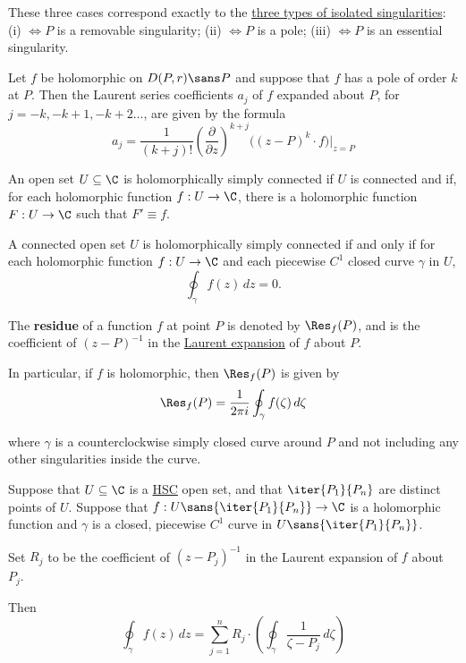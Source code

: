 These three cases correspond exactly to the \href{a7f062e}{three types of
isolated singularities}: (i) $\iff P$ is a removable singularity; (ii) $\iff P$
is a pole; (iii) $\iff P$ is an essential singularity.

\label{c1d2d0c}

Let $f$ be holomorphic on $D(P,r)\sans P$ and suppose that $f$ has a pole of
order $k$ at $P$. Then the Laurent series coefficients $a_j$ of $f$ expanded
about $P$, for $j=-k,-k+1,-k+2\ldots$, are given by the formula
$$
  a_j=\frac1{(k+j)!}\left(\frac\partial{\partial z}\right)^{k+j}
  \big((z-P)^k\cdot f\big)\Bigg|_{z=P}
$$

\label{d20898f}

An open set $U\subseteq\C$ is holomorphically simply connected if $U$ is
connected and if, for each holomorphic function $f:U\to\C$, there is a
holomorphic function $F:U\to\C$ such that $F'\equiv f$.

\label{f3a867e}

A connected open set $U$ is holomorphically simply connected if and only if for
each holomorphic function $f:U\to\C$ and each piecewise $C^1$ closed curve
$\gamma$ in $U$,
$$
  \oint_\gamma f(z)\,dz=0.
$$

\label{ea3ff58}

The \textbf{residue} of a function $f$ at point $P$ is denoted by $\Res_f(P)$,
and is the coefficient of $(z-P)^{-1}$ in the \href{e7fa5f8}{Laurent expansion}
of $f$ about $P$.

In particular, if $f$ is holomorphic, then $\Res_f(P)$ is given by
$$
  \Res_f(P)=\frac1{2\pi i}\oint_\gamma f(\zeta)\,d\zeta
$$

where $\gamma$ is a counterclockwise simply closed curve around $P$ and not
including any other singularities inside the curve.

\label{e1efb5a}

Suppose that $U\subseteq\C$ is a \href{d20898f}{HSC} open set, and that
$\iter{P_1}{P_n}$ are distinct points of $U$. Suppose that
$f:U\sans{\iter{P_1}{P_n}}\to\C$ is a holomorphic function and $\gamma$ is a
closed, piecewise $C^1$ curve in $U\sans{\iter{P_1}{P_n}}$.

Set $R_j$ to be the coefficient of $(z-P_j)^{-1}$ in the Laurent expansion of
$f$ about $P_j$.

Then
$$
  \oint_\gamma f(z)\,dz=\sum_{j=1}^nR_j\cdot\left(\oint_\gamma\frac1{\zeta-P_j}\,d\zeta\right)
$$

